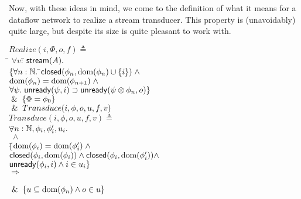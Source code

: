 Now, with these ideas in mind, we come to the definition of what it
means for a dataflow network to realize a stream transducer. This
property is (unavoidably) quite large, but despite its size is quite
pleasant to work with.
\begin{tabbing}
$Realize(i, \Phi, o, f) \triangleq$ \\
\;\;\= $\forall v:$\=$\,\mathsf{stream}({A}).\;$  \\
\>\> $\{\forall n:\mathbb{N}.\;$\=$\mathsf{closed}({\phi_n}, {\mbox{dom}({\phi_n}) \cup \{{i}\}}) \;\land$ \\
\>\>\>$\mbox{dom}({\phi_n}) = \mbox{dom}({\phi_{n+1}})\; \land$ \\
\>\>\>$\forall \psi.\; \mathsf{unready}({\psi}, {i}) \supset \mathsf{unready}({\psi \otimes \phi_n}, {o})\}$ \\
\>\> $\;\&\; \; \{\Phi = \phi_0\}$ \\
\>\> $\;\&\; \;  Transduce(i, \phi, o, u, f, v)$ \\[1em]


$Transduce(i, \phi, o, u, f, v) \triangleq$ \\
\> $\forall $\=$ n:\mathbb{N}, \phi_i, \phi'_i, u_i.$ \\
\>\>  $\; \land$ \\
\>\> $\{$\=$\mbox{dom}({\phi_i}) = \mbox{dom}({\phi'_i}) \;\land $ \\
\>\>     \>$\mathsf{closed}({\phi_i}, {\mbox{dom}({\phi_i})}) \land 
            \mathsf{closed}({\phi_i}, {\mbox{dom}({\phi'_i})}) \land $ \\
\>\>     \>$\mathsf{unready}({\phi_i}, {i}) \land
            i \in u_i\}$ \\
\>\> $\Longrightarrow$ \\
\>\>  \\
\>\> $\;\&\;\; \{u \subseteq \mbox{dom}({\phi_n}) \land o \in u\}$ \\
\end{tabbing}

